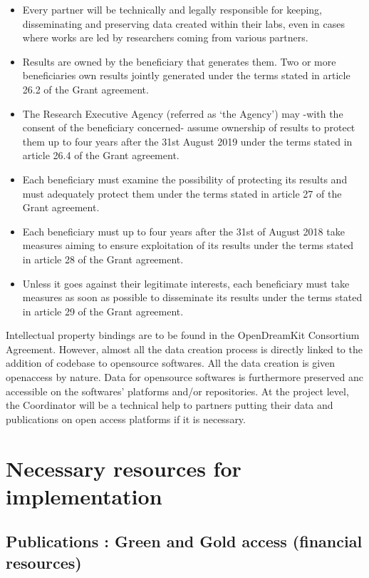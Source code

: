 \documentclass{deliverablereport}
\begin{document}
\begin{itemize}
\item{}Every partner will be technically and legally responsible for keeping, disseminating and preserving data created within their labs, even in cases where works are led by researchers coming from various partners.
\item{}Results are owned by the beneficiary that generates them. Two or more beneficiaries own results jointly generated under the terms stated in article 26.2 of the Grant agreement.
\item{}The Research Executive Agency (referred as ‘the Agency’) may -with the consent of the beneficiary concerned- assume ownership of results to protect them up to four years after the 31st August 2019 under the terms stated in article 26.4 of the Grant agreement.
\item{}Each beneficiary must examine the possibility of protecting its results and must adequately protect them under the terms stated in article 27 of the Grant agreement.
\item{}Each beneficiary must up to four years after the 31st of August 2018 take measures aiming to ensure exploitation of its results under the terms stated in article 28 of the Grant agreement.
\item{}Unless it goes against their legitimate interests, each beneficiary must take measures as soon as possible to disseminate its results under the terms stated in article 29 of the Grant agreement.
\end{itemize}
 

Intellectual property bindings are to be found in the OpenDreamKit Consortium Agreement.
However, almost all the data creation process is directly linked to the addition of  codebase to opensource softwares. All the data creation is given openaccess by nature. Data for opensource softwares is furthermore preserved anc accessible on the softwares' platforms and/or repositories.
At the project level, the Coordinator will be a technical help to partners putting their data and publications on open access platforms if it is necessary.

\section{Necessary resources for implementation}
\subsection{Publications : Green and Gold access (financial resources)}
\end{document}
